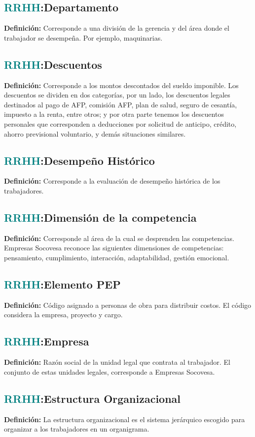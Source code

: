 \documentclass[12pt]{article}
\begin{document}
\subsection{\textcolor{teal}{RRHH}:{Departamento}}
\textbf{Definición:} Corresponde a una división de la gerencia y del área donde el trabajador se desempeña. Por ejemplo, maquinarias.
\subsection{\textcolor{teal}{RRHH}:{Descuentos}}
\textbf{Definición:} Corresponde a los montos descontados del sueldo imponible. Los descuentos se dividen en dos categorías, por un lado, los descuentos legales destinados al pago de AFP, comisión AFP, plan de salud, seguro de cesantía, impuesto a la renta, entre otros; y por otra parte tenemos los descuentos personales que corresponden a deducciones por solicitud de anticipo, crédito, ahorro previsional voluntario, y demás situaciones similares.
\subsection{\textcolor{teal}{RRHH}:{Desempeño Histórico}}
\textbf{Definición:} Corresponde a la evaluación de desempeño histórica de los trabajadores.
\subsection{\textcolor{teal}{RRHH}:{Dimensión de la competencia}}
\textbf{Definición:} Corresponde al área de la cual se desprenden las competencias. Empresas Socovesa reconoce las siguientes dimensiones de competencias: pensamiento, cumplimiento, interacción, adaptabilidad, gestión emocional.

\subsection{\textcolor{teal}{RRHH}:{Elemento PEP}}
\textbf{Definición:} Código asignado a personas de obra para distribuir costos. El código considera la empresa, proyecto y cargo.
\subsection{\textcolor{teal}{RRHH}:{Empresa}}
\textbf{Definición:} Razón social de la unidad legal que contrata al trabajador. El conjunto de estas unidades legales, corresponde a Empresas Socovesa.
\subsection{\textcolor{teal}{RRHH}:{Estructura Organizacional}}
\textbf{Definición:} La estructura organizacional es el sistema jerárquico escogido para organizar a los trabajadores en un organigrama.
\end{document}
